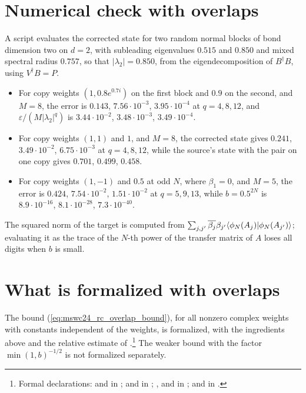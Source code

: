 \documentclass{article}
\begin{document}
\section{Numerical check with overlaps}
A script evaluates the corrected state for two random normal blocks of bond dimension two on
$d=2$, with subleading eigenvalues $0.515$ and $0.850$ and mixed spectral radius $0.757$, so that
$\lvert\lambda_2\rvert=0.850$, from the eigendecomposition of $B^\dagger B$, using
$V^\dagger B=P$.
\begin{itemize}
    \item For copy weights $(1,0.8e^{0.7i})$ on the first block and $0.9$ on the second, and
          $M=8$, the error is $0.143$, $7.56\cdot10^{-3}$, $3.95\cdot10^{-4}$ at $q=4,8,12$, and
          $\varepsilon/(M\lvert\lambda_2\rvert^q)$ is $3.44\cdot10^{-2}$, $3.48\cdot10^{-3}$,
          $3.49\cdot10^{-4}$.
    \item For copy weights $(1,1)$ and $1$, and $M=8$, the corrected state gives $0.241$,
          $3.49\cdot10^{-2}$, $6.75\cdot10^{-3}$ at $q=4,8,12$, while the source's state with
          the pair on one copy gives $0.701$, $0.499$, $0.458$.
    \item For copy weights $(1,-1)$ and $0.5$ at odd $N$, where $\beta_1=0$, and $M=5$, the
          error is $0.424$, $7.54\cdot10^{-2}$, $1.51\cdot10^{-2}$ at $q=5,9,13$, while
          $b=0.5^{2N}$ is $8.9\cdot10^{-16}$, $8.1\cdot10^{-28}$, $7.3\cdot10^{-40}$.
\end{itemize}
The squared norm of the target is computed from
$\sum_{j,j'}\overline{\beta_j}\beta_{j'}\langle \phi_N(A_j) | \phi_N(A_{j'}) \rangle$; evaluating it as the
trace of the $N$-th power of the transfer matrix of $A$ loses all digits when $b$ is small.

\section{What is formalized with overlaps}
The bound (\ref{eq:mswc24_rc_overlap_bound}), for all nonzero complex weights with constants
independent of the weights, is formalized, with the ingredients above and the relative estimate
of \cite{gap:mswc24_repeated_overlap_small_weight_sum}.\footnote{Formal declarations:
     and
     in
    ;
     and
     in
    ;
    ,
     and
     in
    ;
     and
     in
    .}
The weaker bound with the factor $\min(1,b)^{-1/2}$ is not formalized separately.
\end{document}
